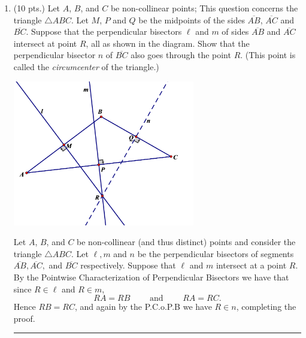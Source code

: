 \documentclass[12pt]{article}
\newcommand{\spand}{\qquad\text{ and }\qquad}
\newcommand{\seg}[1]{\overline{#1}}
\newenvironment{proof}{\noindent {\bf Proof:}}{\hfill
\rule{1mm}{3mm} \bigskip}
\begin{document}
\begin{enumerate}
\item (10 pts.) Let $A$, $B$, and $C$ be non-collinear points;  This question concerns the triangle $\triangle ABC$.  Let $M$, $P$ and $Q$ be the midpoints of the sides $\seg{AB}$, $\seg{AC}$ and $\seg{BC}$.  Suppose that the perpendicular bisectors $\ell$ and $m$ of sides $\seg{AB}$ and $\seg{AC}$ intersect at point $R$, all as shown in the diagram.  Show that the perpendicular bisector $n$ of $\seg{BC}$ also goes through the point $R$. (This point is called the {\em circumcenter} of the triangle.)

\begin{center}
\includegraphics[height=2.5in]{midtermF12_1.png}
\end{center}

	\begin{proof} Let  $A$, $B$, and $C$ be non-collinear (and thus distinct) points and consider the triangle $\triangle ABC$. Let $\ell, m$ and $n$ be the perpendicular bisectors of segments $\seg{AB}, \seg{AC},$ and $\seg{BC}$ respectively. Suppose that $\ell$ and $m$ intersect at a point $R$. By the Pointwise Characterization of Perpendicular Bisectors we have that since $R\in\ell$ and $R\in m$, $$RA=RB \spand RA=RC.$$ Hence $RB=RC$, and again by the P.C.o.P.B we have $R\in n$, completing the proof.
	\end{proof}
	
\end{enumerate}
\end{document}
